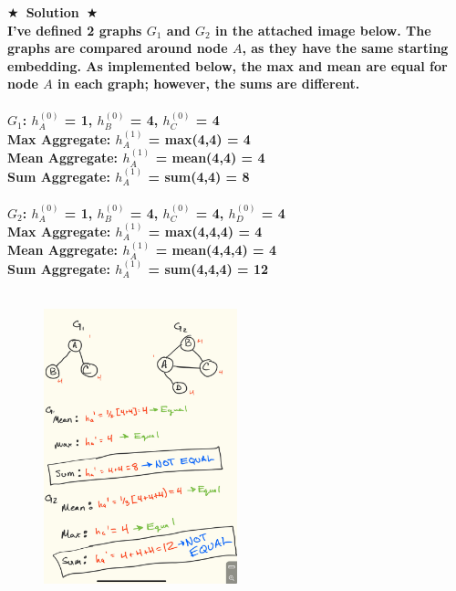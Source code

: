 \documentclass{article}
\numberwithin{figure}{section}
\newcommand{\Solution}[1]{{\medskip \color{red} \bf $\bigstar$~\sf \textbf{Solution}~$\bigstar$ \sf #1 } \bigskip}
\begin{document}
\Solution{\\I've defined 2 graphs $G_1$ and $G_2$ in the attached image below. The graphs are compared around node $A$, as they have the same starting embedding. As implemented below, the max and mean are equal for node $A$ in each graph; however, the sums are different.
\\\\
\hspace{2cm}$G_1$: $h^{(0)}_{A}$ = 1, $h^{(0)}_{B}$ = 4, $h^{(0)}_{C}$ = 4
\\
\hspace{2cm} Max Aggregate: $h^{(1)}_{A}$ = max(4,4) = 4\\
\hspace{2cm} Mean Aggregate: $h^{(1)}_{A}$ = mean(4,4) = 4        \\
\hspace{2cm} Sum Aggregate: $h^{(1)}_{A}$ = sum(4,4) = 8           \\\\
\hspace{2cm}$G_2$: $h^{(0)}_{A}$ = 1, $h^{(0)}_{B}$ = 4, $h^{(0)}_{C}$ = 4, $h^{(0)}_{D}$ = 4
\\
\hspace{2cm} Max Aggregate: $h^{(1)}_{A}$ = max(4,4,4) = 4\\
\hspace{2cm} Mean Aggregate: $h^{(1)}_{A}$ = mean(4,4,4) = 4        \\
\hspace{2cm} Sum Aggregate: $h^{(1)}_{A}$ = sum(4,4,4) = 12           \\\\
\begin{figure}[H]
        \centering
\centering \includegraphics[width=0.5\textwidth]{CS224W_Homework1/graph_aggregate.jpg}
        \end{figure}

}
\end{document}
